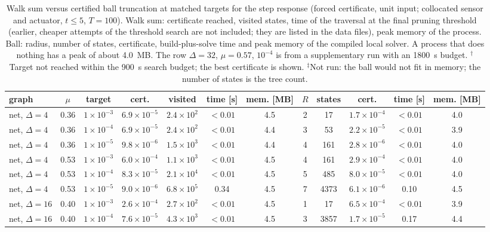 \begin{table}[t]
\footnotesize\setlength{\tabcolsep}{3pt}
\caption{Walk sum versus certified ball truncation at matched targets for the step response (forced certificate, unit input; collocated sensor and actuator, $t\le5$, $T=100$). Walk sum: certificate reached, visited states, time of the traversal at the final pruning threshold (earlier, cheaper attempts of the threshold search are not included; they are listed in the data files), peak memory of the process. Ball: radius, number of states, certificate, build-plus-solve time and peak memory of the compiled local solver. A process that does nothing has a peak of about 4.0~MB. The row $\Delta=32$, $\mu=0.57$, $10^{-4}$ is from a supplementary run with an 1800~s budget. $^\dagger$Target not reached within the 900~s search budget; the best certificate is shown. $^\ddagger$Not run: the ball would not fit in memory; the number of states is the tree count.}\label{tab:crossover}
\begin{ruledtabular}
\begin{tabular}{lcc|cccc|ccccc}
graph & $\mu$ & target & cert. & visited & time [s] & mem. [MB] & $R$ & states & cert. & time [s] & mem. [MB]\\\hline
net, $\Delta=4$ & 0.36 & $1\times10^{-3}$ & $6.9\times10^{-5}$ & $2.4\times10^{2}$ & $<0.01$ & 4.5 & 2 & 17 & $1.7\times10^{-4}$ & $<0.01$ & 4.0 \\
net, $\Delta=4$ & 0.36 & $1\times10^{-4}$ & $6.9\times10^{-5}$ & $2.4\times10^{2}$ & $<0.01$ & 4.4 & 3 & 53 & $2.2\times10^{-5}$ & $<0.01$ & 3.9 \\
net, $\Delta=4$ & 0.36 & $1\times10^{-5}$ & $9.8\times10^{-6}$ & $1.5\times10^{3}$ & $<0.01$ & 4.4 & 4 & 161 & $2.8\times10^{-6}$ & $<0.01$ & 4.0 \\
net, $\Delta=4$ & 0.53 & $1\times10^{-3}$ & $6.0\times10^{-4}$ & $1.1\times10^{3}$ & $<0.01$ & 4.5 & 4 & 161 & $2.9\times10^{-4}$ & $<0.01$ & 4.0 \\
net, $\Delta=4$ & 0.53 & $1\times10^{-4}$ & $8.3\times10^{-5}$ & $2.1\times10^{4}$ & $<0.01$ & 4.5 & 5 & 485 & $8.0\times10^{-5}$ & $<0.01$ & 4.0 \\
net, $\Delta=4$ & 0.53 & $1\times10^{-5}$ & $9.0\times10^{-6}$ & $6.8\times10^{5}$ & 0.34 & 4.5 & 7 & 4373 & $6.1\times10^{-6}$ & 0.10 & 4.5 \\
net, $\Delta=16$ & 0.40 & $1\times10^{-3}$ & $2.6\times10^{-4}$ & $2.7\times10^{2}$ & $<0.01$ & 4.5 & 1 & 17 & $6.5\times10^{-4}$ & $<0.01$ & 3.9 \\
net, $\Delta=16$ & 0.40 & $1\times10^{-4}$ & $7.6\times10^{-5}$ & $4.3\times10^{3}$ & $<0.01$ & 4.5 & 3 & 3857 & $1.7\times10^{-5}$ & 0.17 & 4.4 \\

\end{tabular}
\end{ruledtabular}
\end{table}
